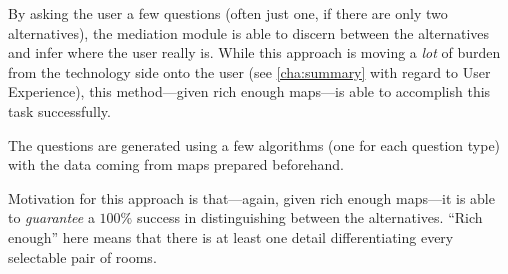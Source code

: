 By asking the user a few questions (often just one, if there are only two alternatives), the mediation module is able to discern between the alternatives and infer where the user really is. While this approach is moving a \emph{lot} of burden from the technology side onto the user (see \cref{cha:summary} with regard to User Experience), this method---given rich enough maps---is able to accomplish this task successfully.

The questions are generated using a few algorithms (one for each question type) with the data coming from maps prepared beforehand.

Motivation for this approach is that---again, given rich enough maps---it is able to \emph{guarantee} a $100\%$ success in distinguishing between the alternatives. ``Rich enough'' here means that there is at least one detail differentiating every selectable pair of rooms.
